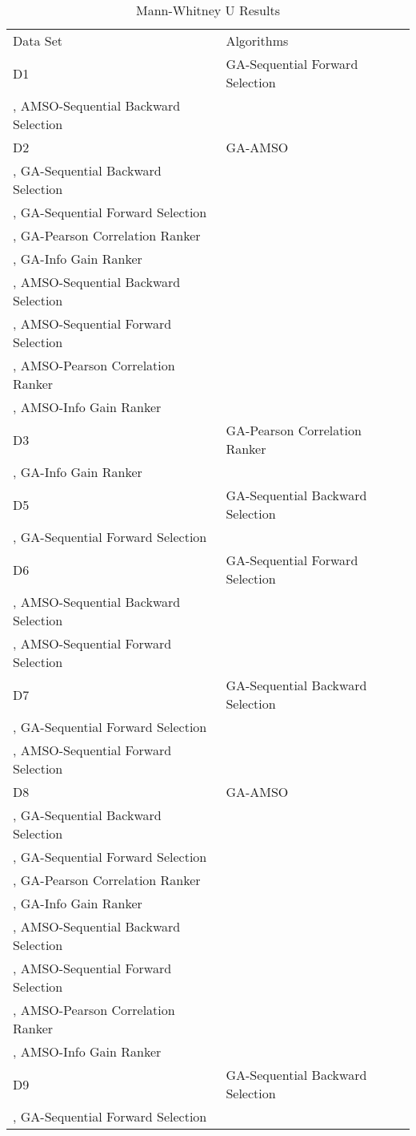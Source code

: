 \begin{table}
\caption{Mann-Whitney U Results}
\label{tbl:mann:whitney:u}
\begin{tabular}{ll}
\noalign{\smallskip}\hline\noalign{\smallskip}
Data Set & Algorithms \\
\noalign{\smallskip}\hline
D1&GA-Sequential Forward Selection\\
, AMSO-Sequential Backward Selection\\
D2&GA-AMSO\\
, GA-Sequential Backward Selection\\
, GA-Sequential Forward Selection\\
, GA-Pearson Correlation Ranker\\
, GA-Info Gain Ranker\\
, AMSO-Sequential Backward Selection\\
, AMSO-Sequential Forward Selection\\
, AMSO-Pearson Correlation Ranker\\
, AMSO-Info Gain Ranker\\
D3&GA-Pearson Correlation Ranker\\
, GA-Info Gain Ranker\\
D5&GA-Sequential Backward Selection\\
, GA-Sequential Forward Selection\\
D6&GA-Sequential Forward Selection\\
, AMSO-Sequential Backward Selection\\
, AMSO-Sequential Forward Selection\\
D7&GA-Sequential Backward Selection\\
, GA-Sequential Forward Selection\\
, AMSO-Sequential Forward Selection\\
D8&GA-AMSO\\
, GA-Sequential Backward Selection\\
, GA-Sequential Forward Selection\\
, GA-Pearson Correlation Ranker\\
, GA-Info Gain Ranker\\
, AMSO-Sequential Backward Selection\\
, AMSO-Sequential Forward Selection\\
, AMSO-Pearson Correlation Ranker\\
, AMSO-Info Gain Ranker\\
D9&GA-Sequential Backward Selection\\
, GA-Sequential Forward Selection\\

\end{tabular}
\end{table}
